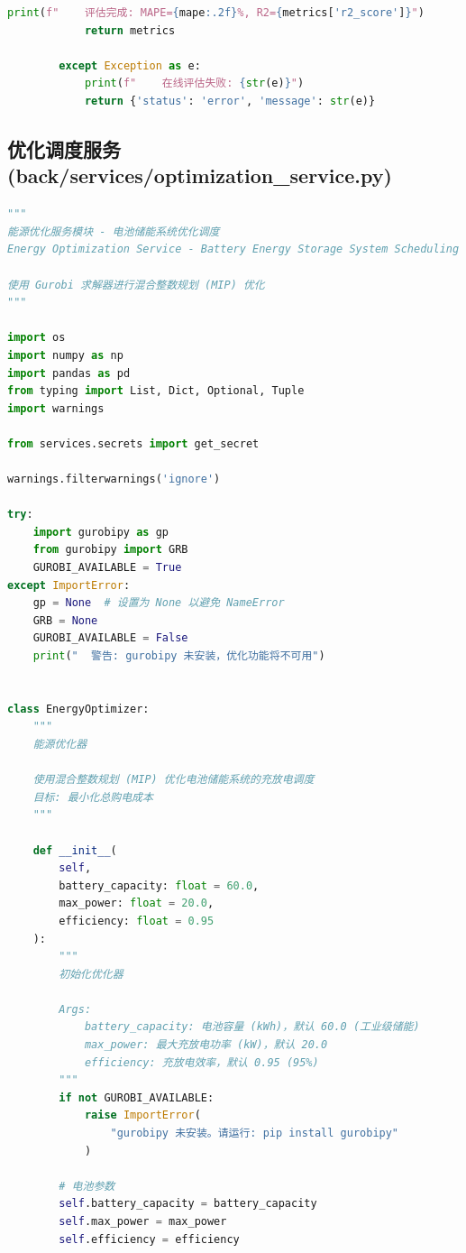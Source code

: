 \begin{lstlisting}[style=codestyle, language=Python, caption={机器学习预测服务}]
            print(f"    评估完成: MAPE={mape:.2f}%, R2={metrics['r2_score']}")
            return metrics
            
        except Exception as e:
            print(f"    在线评估失败: {str(e)}")
            return {'status': 'error', 'message': str(e)}
\end{lstlisting}

\subsection{优化调度服务 (back/services/optimization\_service.py)}
\begin{lstlisting}[style=codestyle, language=Python, caption={Gurobi 优化调度服务}]
"""
能源优化服务模块 - 电池储能系统优化调度
Energy Optimization Service - Battery Energy Storage System Scheduling

使用 Gurobi 求解器进行混合整数规划 (MIP) 优化
"""

import os
import numpy as np
import pandas as pd
from typing import List, Dict, Optional, Tuple
import warnings

from services.secrets import get_secret

warnings.filterwarnings('ignore')

try:
    import gurobipy as gp
    from gurobipy import GRB
    GUROBI_AVAILABLE = True
except ImportError:
    gp = None  # 设置为 None 以避免 NameError
    GRB = None
    GUROBI_AVAILABLE = False
    print("  警告: gurobipy 未安装，优化功能将不可用")


class EnergyOptimizer:
    """
    能源优化器
    
    使用混合整数规划 (MIP) 优化电池储能系统的充放电调度
    目标: 最小化总购电成本
    """
    
    def __init__(
        self,
        battery_capacity: float = 60.0,
        max_power: float = 20.0,
        efficiency: float = 0.95
    ):
        """
        初始化优化器
        
        Args:
            battery_capacity: 电池容量 (kWh)，默认 60.0 (工业级储能)
            max_power: 最大充放电功率 (kW)，默认 20.0
            efficiency: 充放电效率，默认 0.95 (95%)
        """
        if not GUROBI_AVAILABLE:
            raise ImportError(
                "gurobipy 未安装。请运行: pip install gurobipy"
            )
        
        # 电池参数
        self.battery_capacity = battery_capacity
        self.max_power = max_power
        self.efficiency = efficiency
        

\end{lstlisting}
